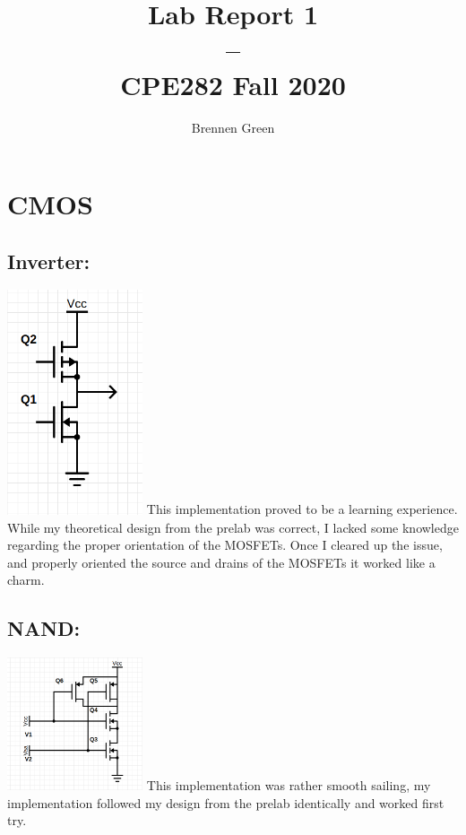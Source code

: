 \documentclass[11pt]{article}
\begin{document}
\date{} 
\title{Lab Report 1\\--\\\large CPE282 Fall 2020}
\author{Brennen Green}
\maketitle

\section{CMOS}
\subsection[]{Inverter:}
\includegraphics[width=4cm, keepaspectratio]{inverter}\newline
This implementation proved to be a learning experience. While my theoretical design
from the prelab was correct, I lacked some knowledge regarding the proper orientation
of the MOSFETs. Once I cleared up the issue, and properly oriented the
source and drains of the MOSFETs it worked like a charm.
\subsection[]{NAND:}
\includegraphics[width=4cm, keepaspectratio]{NAND}\newline
This implementation was rather smooth sailing, my implementation followed my design
from the prelab identically and worked first try.
\end{document}
